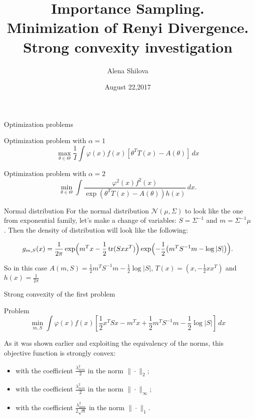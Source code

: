 \documentclass[10pt]{beamer}
\title{Importance Sampling. \\ Minimization of Renyi Divergence. \\
Strong convexity investigation}
\author{Alena Shilova}
\date{August 22,2017}
\institute{Skoltech}
\DeclareMathOperator{\tr}{tr}
\begin{document}
\maketitle


\begin{frame}{Optimization problems}

\begin{block}{Optimization problem with $\alpha  = 1$}
\[
\max_{\theta \in \Theta} \frac 1I \int  \varphi(x) f(x) \left[ \theta^T T(x) - A(\theta) \right] \, dx
\]
\end{block}

\begin{block}{Optimization problem with $\alpha = 2$}
\[
 \min_{\theta \in \Theta} \int \frac{\varphi^2(x)f^2(x)}{\exp(\theta^TT(x) - A(\theta))h(x)} \, dx. 
\]
\end{block}

\end{frame}

\begin{frame}{Normal distribution}
For the normal distribution $\mathcal{N} (\mu, \Sigma)$ to look like the one from exponential family, let's make a change of variables: $S = \Sigma^{-1}$ and $m = \Sigma^{-1} \mu$. Then the density of distribution will look like the following:

\[
g_{m,S}(x) = \frac1{2\pi} \exp \Bigl( m^T x - \frac 12 \tr( Sxx^T ) \Bigr) \exp \Bigl(- \frac 1 2 \bigl( m^TS^{-1}m - \log |S| \bigr) \Bigr).
\]

So in this case $A(m, S) = \frac 12 m^TS^{-1} m - \frac 12 \log |S|$, $T(x) = (x, -\frac 12 xx^T)$ and $h(x) = \frac 1{2\pi}$

\end{frame}

\begin{frame}{Strong convexity of the first problem}
\begin{block}{Problem}
\[
\min_{m,S} \int \varphi(x)f(x)\left[\frac12 x^TSx - m^Tx + \frac12 m^T S^{-1}m - \frac 12 \log |S|  \right] \, dx
\]
\end{block}

As it was shown earlier and exploiting the equivalency of the norms, this objective function is strongly convex:
\begin{itemize}
\item with the coefficient $\frac{\lambda_{min}^2}{2}$ in the norm $\|\cdot\|_2$;
\item with the coefficient $\frac{\lambda_{min}^2}{2}$ in the norm $\|\cdot\|_{\infty}$;
\item with the coefficient $\frac{\lambda_{min}^2}{2 \sqrt{n}}$ in the norm $\|\cdot\|_{1}$.

\end{itemize}
\end{frame}
\end{document}
